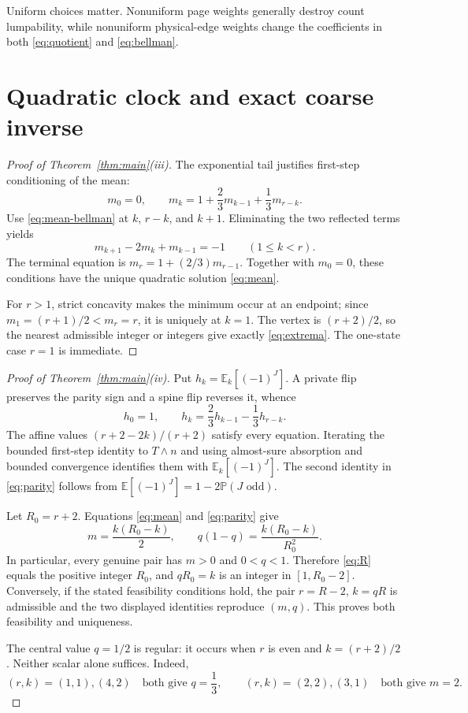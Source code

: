 \documentclass[a4paper,10pt]{amsart}
\theoremstyle{remark}
\newcommand{\Prob}{\mathbb P}
\newcommand{\E}{\mathbb E}
\begin{document}
Uniform choices matter.  Nonuniform page weights generally destroy count
lumpability, while nonuniform physical-edge weights change the coefficients
in both \eqref{eq:quotient} and \eqref{eq:bellman}.

\section{Quadratic clock and exact coarse inverse}\label{sec:inverse}

\begin{proof}[Proof of Theorem~\ref{thm:main}(iii)]
The exponential tail justifies first-step conditioning of the mean:
\begin{equation}\label{eq:mean-bellman}
 m_0=0,\qquad
 m_k=1+\frac23m_{k-1}+\frac13m_{r-k}.
\end{equation}
Use \eqref{eq:mean-bellman} at $k$, $r-k$, and $k+1$.  Eliminating the two
reflected terms yields
\[
 m_{k+1}-2m_k+m_{k-1}=-1\qquad(1\leq k<r).
\]
The terminal equation is $m_r=1+(2/3)m_{r-1}$.  Together with $m_0=0$, these
conditions have the unique quadratic solution \eqref{eq:mean}.

For $r>1$, strict concavity makes the minimum occur at an endpoint; since
$m_1=(r+1)/2<m_r=r$, it is uniquely at $k=1$.  The vertex is
$(r+2)/2$, so the nearest admissible integer or integers give exactly
\eqref{eq:extrema}.  The one-state case $r=1$ is immediate.
\end{proof}

\begin{proof}[Proof of Theorem~\ref{thm:main}(iv)]
Put $h_k=\E_k[(-1)^J]$.  A private flip preserves the parity sign and a spine
flip reverses it, whence
\begin{equation}\label{eq:parity-bellman}
 h_0=1,\qquad h_k=\frac23h_{k-1}-\frac13h_{r-k}.
\end{equation}
The affine values $(r+2-2k)/(r+2)$ satisfy every equation.  Iterating the
bounded first-step identity to $T\wedge n$ and using almost-sure absorption
and bounded convergence identifies them with $\E_k[(-1)^J]$.  The second
identity in \eqref{eq:parity} follows from
$\E[(-1)^J]=1-2\Prob(J\text{ odd})$.

Let $R_0=r+2$.  Equations \eqref{eq:mean} and \eqref{eq:parity} give
\[
 m=\frac{k(R_0-k)}2,\qquad
 q(1-q)=\frac{k(R_0-k)}{R_0^2}.
\]
In particular, every genuine pair has $m>0$ and $0<q<1$.  Therefore
\eqref{eq:R} equals the positive integer $R_0$, and $qR_0=k$ is an
integer in $[1,R_0-2]$.  Conversely, if the stated feasibility conditions
hold, the pair $r=R-2$, $k=qR$ is admissible and the two displayed identities
reproduce $(m,q)$.  This proves both feasibility and uniqueness.

The central value $q=1/2$ is regular: it occurs when $r$ is even and
$k=(r+2)/2$.  Neither scalar alone suffices.  Indeed,
\[
 (r,k)=(1,1),(4,2)\quad\text{both give }q=\frac13,
 \qquad
 (r,k)=(2,2),(3,1)\quad\text{both give }m=2.
\]
\end{proof}
\end{document}

